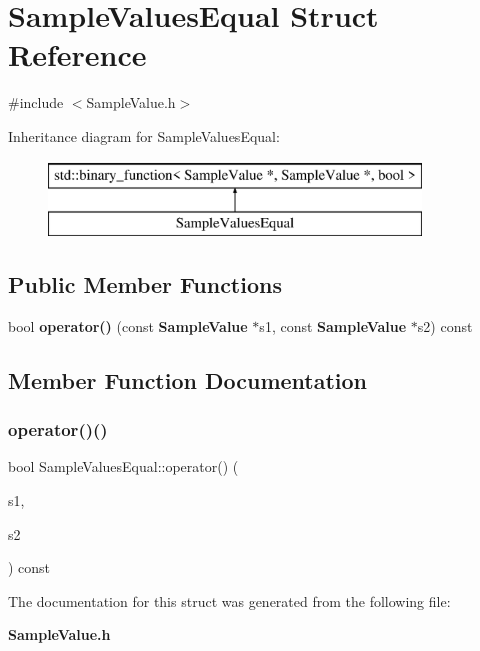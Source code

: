 \section{Sample\+Values\+Equal Struct Reference}
\label{structSampleValuesEqual}


{\ttfamily \#include $<$Sample\+Value.\+h$>$}

Inheritance diagram for Sample\+Values\+Equal\+:\begin{figure}[H]
\begin{center}
\leavevmode
\includegraphics[height=2.000000cm]{structSampleValuesEqual}
\end{center}
\end{figure}
\subsection*{Public Member Functions}
\begin{DoxyCompactItemize}
\item 
bool \textbf{ operator()} (const \textbf{ Sample\+Value} $\ast$s1, const \textbf{ Sample\+Value} $\ast$s2) const
\end{DoxyCompactItemize}


\subsection{Member Function Documentation}
\mbox{\label{structSampleValuesEqual_a8445d206e656be7919fa235c6693f7fa}} 
\subsubsection{operator()()}
{\footnotesize\ttfamily bool Sample\+Values\+Equal\+::operator() (\begin{DoxyParamCaption}\item[{const \textbf{ Sample\+Value} $\ast$}]{s1,  }\item[{const \textbf{ Sample\+Value} $\ast$}]{s2 }\end{DoxyParamCaption}) const\hspace{0.3cm}{\ttfamily [inline]}}



The documentation for this struct was generated from the following file\+:\begin{DoxyCompactItemize}
\item 
\textbf{ Sample\+Value.\+h}\end{DoxyCompactItemize}

